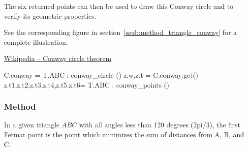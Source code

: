 \medskip
\noindent
The six returned points can then be used to draw this Conway circle and to verify its geometric properties.

\medskip
\noindent
See  the corresponding figure in section~\ref{ssub:method_triangle_conway} for a complete illustration.

\begin{flushright}
\small
\href{https://en.wikipedia.org/wiki/Conway_circle_theorem}{Wikipedia – Conway circle theorem}
\end{flushright}

\vspace{1em}

\begin{mybox}
\begin{tkzexample}
  C.conway = T.ABC : conway_circle ()
  z.w,z.t  = C.conway:get() %
  z.t1,z.t2,z.t3,z.t4,z.t5,z.t6= T.ABC : conway_points ()
\end{tkzexample}
\end{mybox}


\subsubsection{Method } %
\label{ssub:method_triangle_first_fermat_point}
In a given triangle $ABC$ with all angles less than  120 degrees (2pi/3), the first Fermat point  is the point  which minimizes the sum of distances from A, B, and C.


\begin{tkzexample}[latex=.5\textwidth]
\end{tkzexample}


